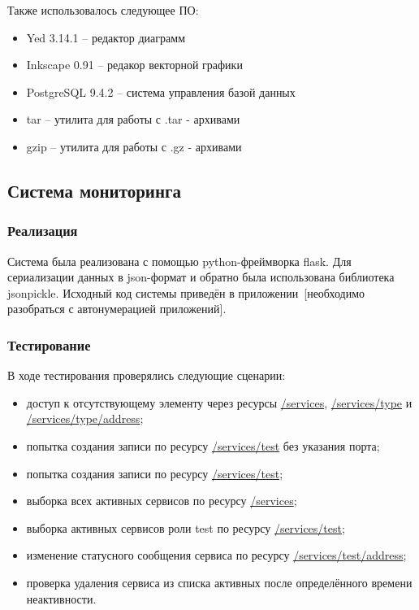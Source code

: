 \documentclass[a4paper,12pt]{report}
\numberwithin{equation}{section}
\begin{document}
  Также использовалось следующее ПО:
  \begin{itemize}
    \item Yed 3.14.1 \cite{yed} -- редактор диаграмм
    \item Inkscape 0.91 \cite{inkscape} -- редакор векторной графики
    \item PostgreSQL 9.4.2 \cite{postgresql} -- система управления базой данных
    \item tar \cite{tarl, tarw} -- утилита для работы с .tar - архивами
    \item gzip \cite{gzipl, gzipw} -- утилита для работы с .gz - архивами
  \end{itemize}
  
  \subsection{Система мониторинга}
  \subsubsection{Реализация}
  Система была реализована с помощью python-фреймворка flask.
  Для сериализации данных в json-формат и обратно была использована библиотека jsonpickle.
  Исходный код системы приведён в приложении~[необходимо разобраться с автонумерацией приложений].
  
  \subsubsection{Тестирование}
  В ходе тестирования проверялись следующие сценарии:
  
  \begin{itemize}
    \item доступ к отсутствующему элементу через ресурсы \url{/services}, \url{/services/type} и \url{/services/type/address};
    \item попытка создания записи по ресурсу \url{/services/test} без указания порта;
    \item попытка создания записи по ресурсу \url{/services/test};
    \item выборка всех активных сервисов по ресурсу \url{/services};
    \item выборка активных сервисов роли test по ресурсу \url{/services/test};
    \item изменение статусного сообщения сервиса по ресурсу \url{/services/test/address};
    \item проверка удаления сервиса из списка активных после определённого времени неактивности.
  \end{itemize}
  
\end{document}
